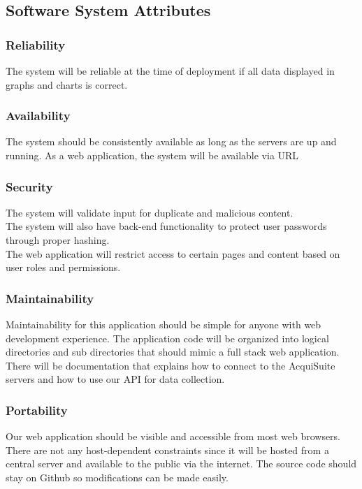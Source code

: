 \documentclass[onecolumn, draftclsnofoot,10pt, compsoc]{IEEEtran}
\begin{document}
    \subsection{Software System Attributes}
    
    \subsubsection{Reliability}
    The system will be reliable at the time of deployment if all data displayed in graphs and charts is correct.\\
    \subsubsection{Availability}
    The system should be consistently available as long as the servers are up and running. As a web application, the system will be available via URL 
    \subsubsection{Security}
    The system will validate input for duplicate and malicious content.\\
    The system will also have back-end functionality to protect user passwords through proper hashing.\\
    The web application will restrict access to certain pages and content based on user roles and permissions.

    \subsubsection{Maintainability}
    Maintainability for this application should be simple for anyone with web development experience. The application code will be organized into logical directories and sub directories that should mimic a full stack web application. There will be documentation that explains how to connect to the AcquiSuite servers and how to use our API for data collection.
    \subsubsection{Portability}
    Our web application should be visible and accessible from most web browsers. There are not any host-dependent constraints since it will be hosted from a central server and available to the public via the internet. The source code should stay on Github so modifications can be made easily.
    
\end{document}
